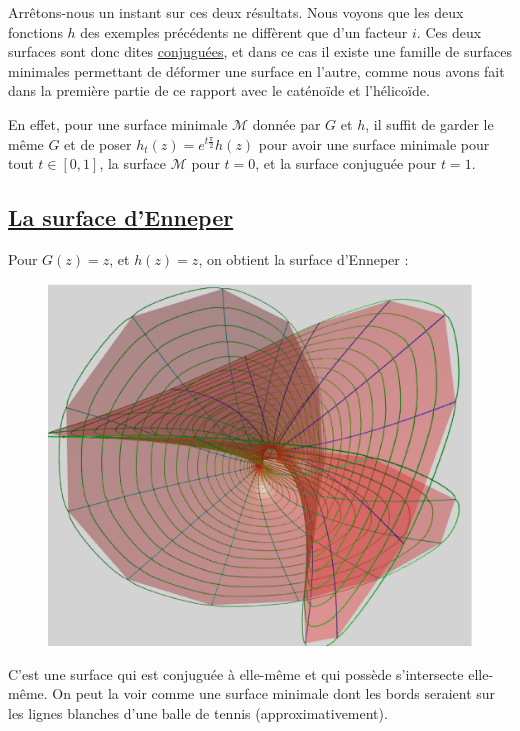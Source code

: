 \documentclass {report}
\begin{document}
Arrêtons-nous un instant sur ces deux résultats. Nous voyons que les deux fonctions $h$ des exemples précédents ne diffèrent que d'un facteur $i$. Ces deux surfaces sont donc dites \uline{conjuguées}, et dans ce cas il existe une famille de surfaces minimales permettant de déformer une surface en l'autre, comme nous avons fait dans la première partie de ce rapport avec le caténoïde et l'hélicoïde. 

En effet, pour une surface minimale $\mathscr{M}$ donnée par $G$ et $h$, il suffit de garder le même $G$ et de poser $h_t(z)=e^{t\frac{\pi}{2}}h(z)$ pour avoir une surface minimale pour tout $t\in[0,1]$, la surface $\mathscr{M}$ pour $t=0$, et la surface conjuguée pour $t=1$.

\subsection[La surface d'Enneper]{\uline{La surface d'Enneper}}


Pour $G(z)=z$, et $h(z)=z$, on obtient la surface d'Enneper : 

\begin{figure}[h!]
      \centering 
      \includegraphics[scale=0.25]{Images_Fichiers/14.eps}
\end{figure}

C'est une surface qui est conjuguée à elle-même et qui possède s'intersecte elle-même. On peut la voir comme une surface minimale dont les bords seraient sur les lignes blanches d'une balle de tennis (approximativement).
\end{document}
